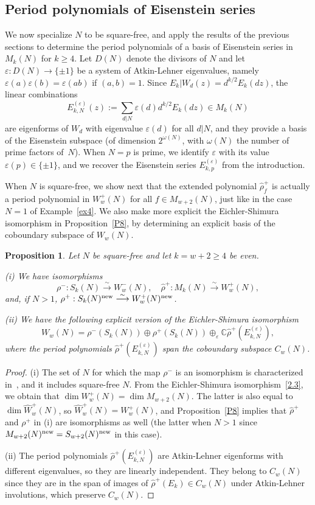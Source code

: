 \documentclass{amsart}
\theoremstyle{plain}
\newtheorem{proposition}[theorem]{Proposition}
\theoremstyle{definition}
\numberwithin{equation}{section}
\newcommand{\C}{{\mathbb C}}
\def\e{\varepsilon} \def\DD{\Delta} \def\G{\Gamma}\def\om{\omega}
\renewcommand{\wr}{\widehat{\rho}}
\newcommand{\wW}{\widehat{W}}
\def\rar{\rightarrow}\def\FF{\mathbb{F}}
\def\lrar{\longrightarrow}
\begin{document}
\subsection{Period polynomials of Eisenstein series}\label{s2.4}
We now specialize $N$ to be square-free, and apply the results of 
the previous sections to determine the period polynomials of a basis of
Eisenstein series in~$M_k(N)$ for $k\ge 4$.
Let $D(N)$ denote the
divisors of $N$ and let $\e:D(N)\rar\{\pm 1\}$
be a system of Atkin-Lehner eigenvalues, namely  
$\e(a)\e(b)=\e(ab)$ if $(a,b)=1$. Since $E_k|W_d (z)=d^{k/2} E_k(dz)$, 
the linear combinations
$$E_{k,N}^{(\e)}(z):=\sum_{d|N} \e(d) d^{k/2} E_k (dz)\in M_k(N)$$ 
are eigenforms of $W_d$ with eigenvalue $\e(d)$ for all $d|N$, and they provide
a basis of the Eisenstein subspace (of dimension $2^{\omega(N)}$, 
with $\omega(N)$ the number of prime factors of~$N$). When $N=p$
is prime, we identify $\e$ with its value $\e(p)\in\{\pm 1\}$, and we recover
the Eisenstein series $E_{k,p}^{(\e)}$ from the introduction. 

When $N$ is square-free, we show next that  the extended polynomial $\wr^+_f$ is actually a 
period polynomial in $W_w^+(N)$ for all $f\in M_{w+2}(N)$, just like in the case $N=1$ of 
Example~\ref{ex4}. We also make more explicit the Eichler-Shimura isomorphism 
in Proposition~\ref{P8}, by determining an explicit basis of the coboundary subspace of $W_w(N)$. 
\begin{proposition}\label{C2}Let $N$ be square-free and let $k=w+2\ge 4$ be even.

\emph{(i)}  We have isomorphisms 
\[\rho^-:S_{k}(N)\overset{\sim}{\lrar} W_w^-(N), \quad
\wr^+: M_{k}(N)\overset{\sim}{\lrar} W_w^+(N),
\]
and, if $N>1$,  $\rho^+:S_k(N)^\new \overset{\sim}{\lrar} W_w^+(N)^\new$.   

\emph{(ii)} We have the following explicit version of the Eichler-Shimura isomorphism 
\[
W_{w}(N)=\rho^-(S_k(N))\oplus \rho^+(S_k(N))
\oplus_{\e} \C \wr^+ (E_{k,N}^{(\e)}) ,\]
where the period polynomials $\wr^+ (E_{k,N}^{(\e)})$ span the coboundary subspace $C_w(N)$. 
\end{proposition}
\begin{proof} (i)
The set of $N$ for which the map $\rho^-$ is an isomorphism is characterized 
in~\cite[Prop. 4.4]{PP}, and it includes square-free $N$.   
From the Eichler-Shimura isomorphism~\eqref{2.3}, we obtain that 
$\dim W_w^+(N)=\dim M_{w+2}(N)$. The latter is also equal to 
$\dim \wW_w^+(N)$,  so $\wW_w^+(N)=W_w^+(N)$, and Proposition~\ref{P8} 
implies that $\wr^+$ and $\rho^+$ in (i) are isomorphisms as well (the latter when $N>1$ since
$M_{w+2}(N)^{\mathrm{new}}=S_{w+2}(N)^{\mathrm{new}}$ in this case).   

(ii) The period polynomials  $\wr^+ (E_{k,N}^{(\e)})$ are Atkin-Lehner eigenforms with different eigenvalues,
so they are linearly independent. They belong to $C_w(N)$ since they are in the span of images of 
$\wr^+(E_k)\in C_w(N)$ under Atkin-Lehner involutions, which preserve $C_w(N)$.
\end{proof}
 
\end{document}
